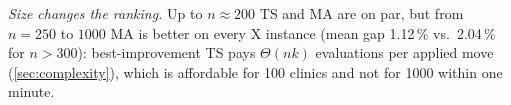 \emph{Size changes the ranking.} Up to $n\approx200$ TS and MA are on par, but from $n=250$ to $1000$ MA is better on every X instance (mean gap 1.12\,\% vs.\ 2.04\,\% for $n>300$): best-improvement TS pays $\Theta(nk)$ evaluations per applied move (\cref{sec:complexity}), which is affordable for 100 clinics and not for 1000 within one minute.
